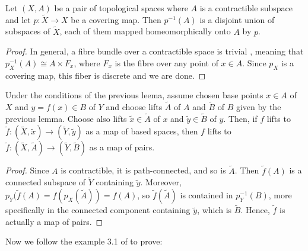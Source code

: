 \documentclass[TFM.tex]{subfiles}
\begin{document}
\begin{lemma}\label{contractible}
Let $(X,A)$ be a pair of topological spaces where $A$ is a contractible subspace  and let $p:\widetilde{X}\to X$ be a covering map. Then $p^{-1}(A)$ is a disjoint union of subspaces of $\widetilde{X}$, each of them mapped homeomorphically onto $A$ by $p$. 
\end{lemma}
\begin{proof}
In general, a fibre bundle over a contractible space is trivial \cite[Proposition 3.5]{bundle}, meaning that $p_X^{-1}(A)\cong A\times F_{x}$, where $F_x$ is the fibre over any point of $x\in A$. Since $p_X$ is a covering map, this fiber is discrete and we are done. 
\end{proof}

\begin{lemma}\label{lift}
Under the conditions of the previous leema, assume chosen base points $x\in A$ of $X$ and $y=f(x)\in B$ of $Y$ and choose lifts $\widetilde{A}$ of $A$ and $\widetilde{B}$ of $B$ given by the previous lemma. Choose also lifts $\widetilde{x}\in\widetilde{A}$ of $x$ and $\widetilde{y}\in\widetilde{B}$ of $y$. Then, if $f$ lifts to $\widetilde{f}:(\widetilde{X},\widetilde{x})\to (\widetilde{Y},\widetilde{y})$ as a map of based spaces, then $f$ lifts to $\widetilde{f}:(\widetilde{X},\widetilde{A})\to (\widetilde{Y},\widetilde{B})$ as a map of pairs. 
\end{lemma}
\begin{proof}
Since $A$ is contractible, it is path-connected, and so is $\widetilde{A}$. Then $\widetilde{f}(A)$ is a connected subspace of $\widetilde{Y}$ containing $\widetilde{y}$. Moreover, $p_Y(\widetilde{f}(A)=f(p_X(\widetilde{A}))=f(A)$, so $\widetilde{f}(\widetilde{A})$ is contained in $p_Y^{-1}(B)$, more specifically in the connected component containing $\widetilde{y}$, which is $\widetilde{B}$. Hence, $\widetilde{f}$ is actually a map of pairs.
\end{proof}

Now we follow the example 3.1 of \cite{bar} to prove:
\end{document}
